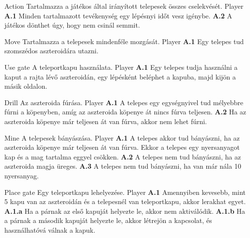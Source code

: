 \documentclass[../../projlab]{subfiles}
\begin{document}
\begin{use-case}
	{Action}
	{Tartalmazza a játékos által irányított telepesek összes cselekvését.}
	{Player}
    \textbf{A.1} Minden tartalmazott tevékenység egy lépésnyi időt vesz igénybe. \newline
	\textbf{A.2} A játékos dönthet úgy, hogy nem csinál semmit.
\end{use-case}

\begin{use-case}
	{Move}
	{Tartalmazza a telepesek mindenféle mozgását.}
	{Player}
    \textbf{A.1} Egy telepes tud szomszédos aszteroidára utazni.
\end{use-case}

\begin{use-case}
	{Use gate}
	{A teleportkapu használata.}
	{Player}
    \textbf{A.1} Egy telepes tudja használni a kaput a rajta lévő aszteroidán, egy lépésként beléphet a kapuba, majd kijön a másik oldalon.  
\end{use-case}

\begin{use-case}
	{Drill}
	{Az aszteroida fúrása.}
	{Player}
    \textbf{A.1} A telepes egy egységnyivel tud mélyebbre fúrni a köpenyben, amíg az aszteroida köpenye át nincs fúrva teljesen.
	\newline
	\textbf{A.2} Ha az aszteroida köpenye már teljesen át van fúrva, akkor nem lehet fúrni.
\end{use-case}

\begin{use-case}
	{Mine}
	{A telepesek bányászása.}
	{Player}
    \textbf{A.1} A telepes akkor tud bányászni, ha az aszteroida köpenye már teljesen át van fúrva. Ekkor a telepes egy nyersanyagot kap és a mag tartalma eggyel csökken.
	\newline
	\textbf{A.2} A telepes nem tud bányászni, ha az aszteroida magja üreges.
	\newline
	\textbf{A.3} A telepes nem tud bányászni, ha van már nála 10 nyersanyag.
\end{use-case}

\begin{use-case}
	{Place gate}
	{Egy teleportkapu lehelyezése.}
	{Player}
    \textbf{A.1} Amennyiben kevesebb, mint 5 kapu van az aszteroidán és a telepesnél van teleportkapu, akkor lerakhat egyet.
	\newline
	\textbf{A.1.a} Ha a párnak az első kapuját helyezte le, akkor nem aktiválódik.
	\newline
	\textbf{A.1.b} Ha a párnak a második kapuját helyezte le, akkor létrejön a kapcsolat, és használhatóvá válnak a kapuk. 
\end{use-case}
\end{document}
